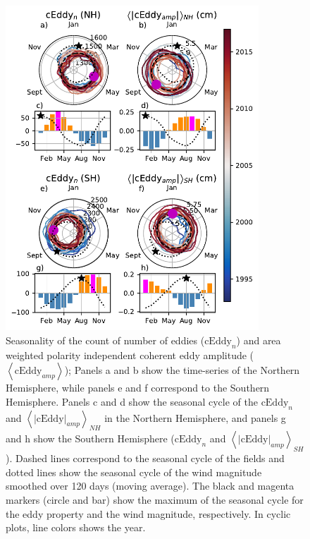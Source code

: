 \documentclass[draft,linenumbers]{agujournal2019}
\newcommand{\cEddy}{\textrm{cEddy}}
\begin{document}

	\begin{figure}
	    \centering
	    \includegraphics[width=95mm]{figures/All_polar_plots_eddy_stats_polarity_V3.pdf}
	    \caption{
		Seasonality of the count of number of eddies ($\cEddy
		_n$) and area weighted polarity independent coherent eddy amplitude ($\left<\cEddy_{amp}\right>$); Panels a and b show the time-series of the Northern Hemisphere, while panels e and f correspond to the Southern Hemisphere. Panels c and d show the seasonal cycle of the $\cEddy_n$ and $\left<|\cEddy|_{amp}\right>_{NH}$ in the Northern Hemisphere, and panels g and h show the Southern Hemisphere ($\cEddy_n$ and $\left<|\cEddy|_{amp}\right>_{SH}$).
		Dashed lines correspond to the seasonal cycle of the fields and dotted lines show the seasonal cycle of the wind magnitude smoothed over 120 days (moving average). 
		The black and magenta markers (circle and bar) show the maximum of the seasonal cycle for the eddy property  and the wind magnitude, respectively. In cyclic plots, line colors shows the year.}
	    \label{fig:eddy_stats}
	\end{figure}
\end{document}
